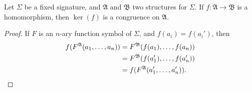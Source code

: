 \documentclass[12pt]{article}
\newcommand{\A}{\mathfrak{A}}
\newcommand{\B}{\mathfrak{B}}
\begin{document}
Let $\Sigma$ be a fixed signature, and $\A$ and $\B$ two structures for $\Sigma$. If $f\colon \A \to \B$ is a homomorphism, then $\ker(f)$ is a congruence on $\A$.
\begin{proof}
If $F$ is an $n$-ary function symbol of $\Sigma$, and \(f(a_i) = f(a_i')\), then
 \begin{align*}
 f(F^\A(a_1, \ldots, a_n)) &= F^\B(f(a_1), \ldots, f(a_n)) \\
 &= F^\B(f(a_1'), \ldots, f(a_n')) \\
 &= f(F^\A(a_1', \ldots, a_n')). \qedhere
 \end{align*}
\end{proof}
\end{document}
